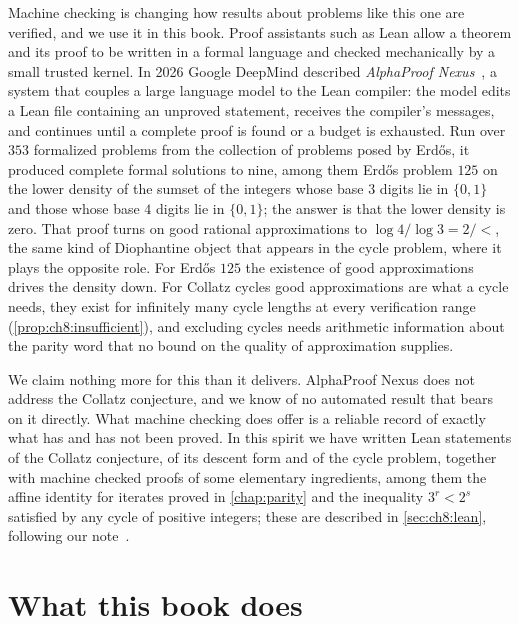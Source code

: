 Machine checking is changing how results about problems like this one are verified, and we use it in this book. Proof assistants such as Lean allow a theorem and its
proof to be written in a formal language and checked mechanically by a small
trusted kernel. In 2026 Google DeepMind described \emph{AlphaProof
Nexus}~\cite{tsoukalas2026}, a system that couples a large language model to
the Lean compiler: the model edits a Lean file containing an unproved
statement, receives the compiler's messages, and continues until a complete
proof is found or a budget is exhausted. Run over $353$ formalized problems
from the collection of problems posed by Erd\H{o}s, it produced complete
formal solutions to nine, among them Erd\H{o}s problem $125$ on the
lower density of the sumset of the integers whose base $3$ digits lie in
$\{0,1\}$ and those whose base $4$ digits lie in $\{0,1\}$; the answer is that
the lower density is zero.
That proof turns on good rational approximations to $\log4/\log3=2/\lt$, the same kind of Diophantine object that appears in the cycle problem, where it plays the opposite role.
For Erd\H{o}s $125$ the existence of good approximations drives the density down.
For Collatz cycles good approximations are what a cycle needs, they exist for infinitely many cycle lengths at every verification range (\cref{prop:ch8:insufficient}), and excluding cycles needs arithmetic information about the parity word that no bound on the quality of approximation supplies.

We claim nothing more for this than it delivers. AlphaProof Nexus does not
address the Collatz conjecture, and we know of no automated result that bears
on it directly. What machine checking does offer is a reliable record of exactly what has
and has not been proved. In this spirit we have written Lean statements of the
Collatz conjecture, of its descent form and of the cycle problem, together
with machine checked proofs of some elementary ingredients, among them the
affine identity for iterates proved in \cref{chap:parity} and the inequality
$3^r<2^s$ satisfied by any cycle of positive integers; these are described in \cref{sec:ch8:lean}, following our note~\cite{polsonsokolov2026nexus}.

\section{What this book does}\label{sec:ch1:plan}

